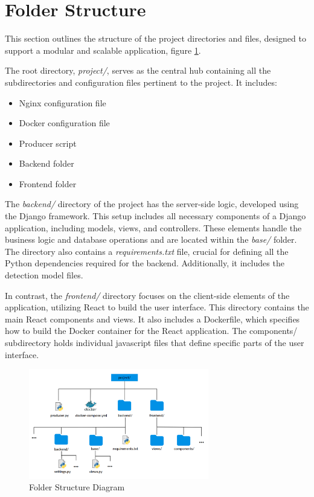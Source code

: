\section{Folder Structure}
This section outlines the structure of the project directories and files, designed to support a modular and 
scalable application, figure \ref{fig:folder-structure}.

The root directory, \textit{project/}, serves as the central hub containing all the subdirectories and 
configuration files pertinent to the project. It includes:
\begin{itemize}
    \item Nginx configuration file
    \item Docker configuration file
    \item Producer script
    \item Backend folder
    \item Frontend folder
\end{itemize}

The \textit{backend/} directory of the project has the server-side logic, developed using the Django framework. 
This setup includes all necessary components of a Django application, including models, views, and 
controllers. These elements handle the business logic and database operations and are located within the \textit{base/} 
folder.
The directory also
contains a \textit{requirements.txt} file, 
crucial for defining all the Python dependencies required for the backend. Additionally, it includes the detection 
model files.

In contrast, the \textit{frontend/} directory focuses on the client-side elements of the application, utilizing React to 
build the user interface. This directory contains the main React components and views. It also includes a 
Dockerfile, which specifies how to build the
Docker container for the React application. 
The components/ subdirectory holds individual javascript files that define specific parts of the user interface.

\begin{figure}[h]
    \centering 
    \includegraphics[width=0.7\textwidth]{figs/folder.png} 
    \caption{Folder Structure Diagram}
    \label{fig:folder-structure}
\end{figure}

